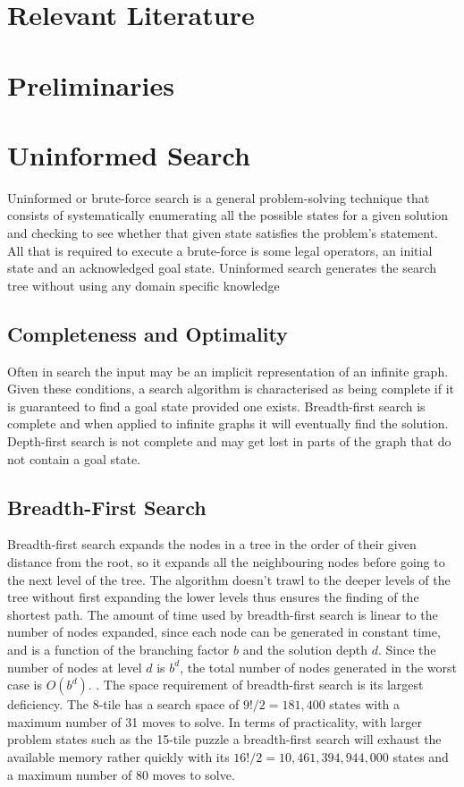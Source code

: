 \documentclass[final]{cmpreport}
\begin{document}
 
 

 


\section{Relevant Literature}


\section{Preliminaries}







\section{Uninformed Search}
Uninformed or brute-force search is a general problem-solving technique that consists of systematically enumerating all the possible states for a given solution and checking to see whether that given state satisfies the problem's statement. All that is required to execute a brute-force is some legal operators, an initial state and an acknowledged goal state. Uninformed search generates the search tree without using any domain specific knowledge
\subsection{Completeness and Optimality}
 Often in search the input may be an implicit representation of an infinite graph. Given these conditions, a search algorithm is characterised as being complete if it is guaranteed to find a goal state provided one exists. Breadth-first search is complete and when applied to infinite graphs it will eventually find the solution. Depth-first search is not complete and may get lost in parts of the graph that do not contain a goal state.
\subsection{Breadth-First Search}
Breadth-first search expands the nodes in a tree in the order of their given distance from the root, so it expands all the neighbouring nodes before going to the next level of the tree. The algorithm doesn't trawl to the deeper levels of the tree without first expanding the lower levels thus ensures the finding of the shortest path. The amount of time used by breadth-first search is linear to the number of nodes expanded, since each node can be generated in constant time, and is a function of the branching factor $b$ and the solution depth $d$. Since the number of nodes at level $d$ is $b^d$, the total number of nodes generated in the worst case is $O(b^d)$. \citep{DBLP:journals/mima/Korf95}. The space requirement of breadth-first search is its largest deficiency. The 8-tile has a search space of $9!/2=181,400$ states with a maximum number of 31 moves to solve. In terms of practicality, with larger problem states such as the 15-tile puzzle a breadth-first search will exhaust the available memory rather quickly with its $16!/2 = 10,461,394,944,000$ states and a maximum number of 80 moves to solve.
\end{document}
